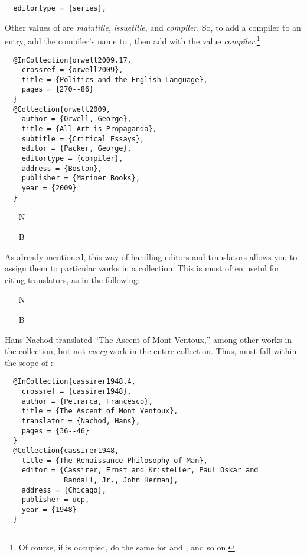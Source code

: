 \documentclass[11pt,letterpaper,oneside]{article}
\begin{document}
\begin{lstlisting}
  editortype = {series},
\end{lstlisting}

Other values of  are \textit{maintitle},
\textit{issuetitle}, and \textit{compiler}. So, to add a compiler to
an entry, add the compiler's name to , then add
 with the value \textit{compiler}.\footnote{Of
course, if  is occupied, do the same for
 and , and so on.}

\begin{lstlisting}
  @InCollection{orwell2009.17,
    crossref = {orwell2009},
    title = {Politics and the English Language},
    pages = {270--86}
  }
  @Collection{orwell2009,
    author = {Orwell, George},
    title = {All Art is Propaganda},
    subtitle = {Critical Essays},
    editor = {Packer, George},
    editortype = {compiler},
    address = {Boston},
    publisher = {Mariner Books},
    year = {2009}
  }
\end{lstlisting}

\begin{itemize}
\item[N] 

\item[B] 
\end{itemize}

As already mentioned, this way of handling editors and translators
allows you to assign them to particular works in a collection. This is
most often useful for citing translators, as in the following:

\begin{itemize}
\item[N] 

\item[B] 
\end{itemize}

\noindent Hans Nachod translated ``The Ascent of Mont Ventoux,'' among
other works in the collection, but not \textit{every} work in the
entire collection. Thus,  must fall within the
scope of :

\begin{lstlisting}
  @InCollection{cassirer1948.4,
    crossref = {cassirer1948},
    author = {Petrarca, Francesco},
    title = {The Ascent of Mont Ventoux},
    translator = {Nachod, Hans},
    pages = {36--46}
  }
  @Collection{cassirer1948,
    title = {The Renaissance Philosophy of Man},
    editor = {Cassirer, Ernst and Kristeller, Paul Oskar and
              Randall, Jr., John Herman},
    address = {Chicago},
    publisher = ucp,
    year = {1948}
  }
\end{lstlisting}
\end{document}
